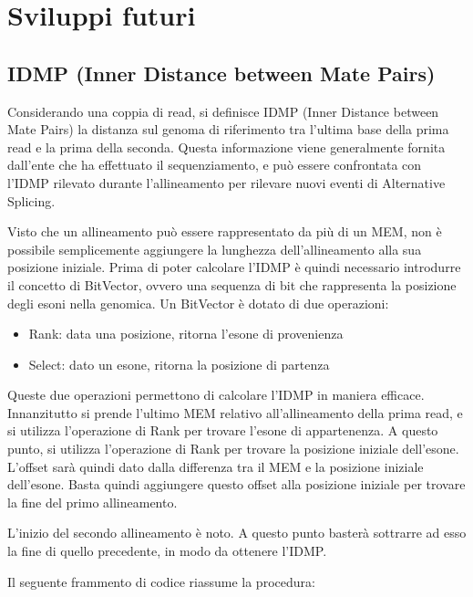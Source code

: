 \newpage

\section{Sviluppi futuri}

\subsection{IDMP (Inner Distance between Mate Pairs)}
Considerando una coppia di read, si definisce IDMP (Inner Distance between Mate Pairs) la distanza sul genoma di riferimento tra l'ultima base della prima read e la prima della seconda. Questa informazione viene generalmente fornita dall'ente che ha effettuato il sequenziamento, e può essere confrontata con l'IDMP rilevato durante l'allineamento per rilevare nuovi eventi di Alternative Splicing.

Visto che un allineamento può essere rappresentato da più di un MEM, non è possibile semplicemente aggiungere la lunghezza dell'allineamento alla sua posizione iniziale. Prima di poter calcolare l'IDMP è quindi necessario introdurre il concetto di BitVector, ovvero una sequenza di bit che rappresenta la posizione degli esoni nella genomica. Un BitVector è dotato di due operazioni:

\begin{itemize}
	\item Rank: data una posizione, ritorna l'esone di provenienza
	\item Select: dato un esone, ritorna la posizione di partenza 
\end{itemize}

Queste due operazioni permettono di calcolare l'IDMP in maniera efficace. Innanzitutto si prende l'ultimo MEM relativo all'allineamento della prima read, e si utilizza l'operazione di Rank per trovare l'esone di appartenenza. A questo punto, si utilizza l'operazione di Rank per trovare la posizione iniziale dell'esone. L'offset sarà quindi dato dalla differenza tra il MEM e la posizione iniziale dell'esone. Basta quindi aggiungere questo offset alla posizione iniziale per trovare la fine del primo allineamento.

L'inizio del secondo allineamento è noto. A questo punto basterà sottrarre ad esso la fine di quello precedente, in modo da ottenere l'IDMP.

Il seguente frammento di codice riassume la procedura:

